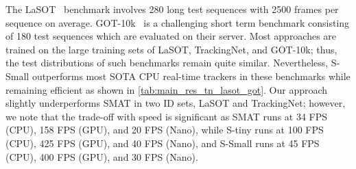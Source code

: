   The LaSOT~\cite{fan2021lasot} benchmark involves 280 long test sequences with 2500 frames per sequence on average.
  GOT-10k~\cite{Huang2021} is a challenging short term benchmark consisting of 180 test sequences which are evaluated on their server. Most approaches are trained on the large training sets of LaSOT, TrackingNet, and GOT-10k; thus, the test distributions of such benchmarks remain quite similar. 
  Nevertheless, S-Small outperforms most SOTA CPU real-time trackers in these benchmarks while remaining efficient as shown in \ref{tab:main_res_tn_lasot_got}. Our approach slightly underperforms SMAT
  in two ID sets, LaSOT and TrackingNet; however, we note that the trade-off with speed is significant as SMAT runs at 34 FPS (CPU), 158 FPS (GPU), and 20 FPS (Nano), while S-tiny runs at 100 FPS (CPU), 425 FPS (GPU), and 40 FPS (Nano), and S-Small runs at 45 FPS (CPU), 400 FPS (GPU), and 30 FPS (Nano). 
  
